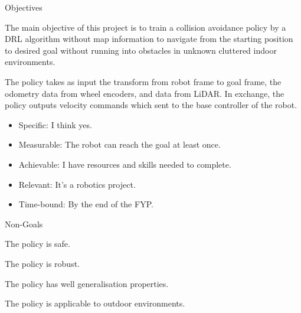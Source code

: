 \begin{frame}{Objectives}

The main objective of this project is to train a collision avoidance policy by a DRL algorithm without map information to navigate from the starting position to desired goal without running into obstacles in unknown cluttered indoor environments.

\bigskip

The policy takes as input the transform from robot frame to goal frame, the odometry data from wheel encoders, and data from LiDAR. In exchange, the policy outputs velocity commands which sent to the base controller of the robot.

\bigskip

\begin{itemize}
   \item Specific: I think yes.
   \item Measurable: The robot can reach the goal at least once.
   \item Achievable: I have resources and skills needed to complete.
   \item Relevant: It's a robotics project.
   \item Time-bound: By the end of the FYP.
\end{itemize}

\end{frame}


\begin{frame}{Non-Goals}

The policy is safe.

\bigskip

The policy is robust.

\bigskip

The policy has well generalisation properties.

\bigskip

The policy is applicable to outdoor environments.

\end{frame}
